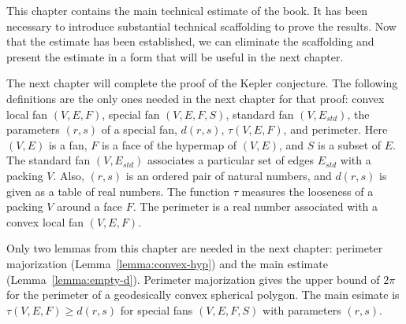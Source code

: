 This chapter contains the main technical estimate of the book.  It
has been necessary to introduce substantial technical scaffolding to
prove the results.  Now that the estimate has been established, we
can eliminate the scaffolding and present the estimate in a form that
will be useful in the next chapter.

The next chapter will complete the proof of the Kepler conjecture.
The following definitions are the only ones needed in the next chapter
for that proof: convex local fan $(V,E,F)$, special fan $(V,E,F,S)$,
standard fan $(V,E_{std})$, the parameters $(r,s)$ of a special fan,
$d(r,s)$, $\tau(V,E,F)$, and perimeter.  Here $(V,E)$ is a fan, $F$ is
a face of the hypermap of $(V,E)$, and $S$ is a subset of $E$.  The
standard fan $(V,E_{std})$ associates a particular set of edges
$E_{std}$ with a packing $V$.  Also, $(r,s)$ is an ordered pair of
natural numbers, and $d(r,s)$ is given as a table of real numbers.
The function $\tau$ measures the looseness of a packing $V$ around a
face $F$.  The perimeter is a real number associated with a convex
local fan $(V,E,F)$.

Only two lemmas from this chapter are needed in the next chapter:
perimeter majorization (Lemma~\ref{lemma:convex-hyp}) and the main
estimate (Lemma~\ref{lemma:empty-d}).  Perimeter majorization gives
the upper bound of $2\pi$ for the perimeter of a geodesically convex
spherical polygon.  The main esimate is $\tau(V,E,F)\ge d(r,s)$ for
special fans $(V,E,F,S)$ with parameters $(r,s)$.
